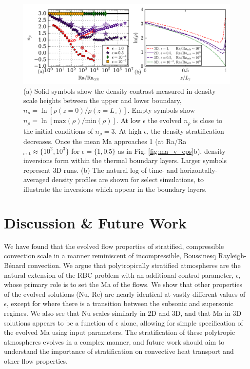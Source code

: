 \documentclass[aps, prfluids, onecolumn, notitlepage, nofootinbib, groupedaddress, amsfonts, amssymb, amsmath]{revtex4-1}
\newcommand{\RB}{Rayleigh-B\'{e}nard }
\begin{document}
\begin{figure}[t!]
\includegraphics[width=\textwidth]{./figs/density_v_ra.png}
\caption{\label{fig:nrho_v_ra} 
(a) Solid symbols show the density contrast measured
in density scale heights between the upper and lower boundary, 
$n_\rho = \ln[\rho(z=0)/\rho(z=L_z)]$.
Empty symbols show 
$n_\rho = \ln[\text{max}(\rho)/\text{min}(\rho)]$. 
At low $\epsilon$ the evolved
$n_{\rho}$ is close to the initial conditions of $n_\rho = 3$.  
At high $\epsilon$,
the density stratification decreases.  Once the mean 
Ma approaches 1 (at Ra/Ra$_{\text{crit}} \approx \{10^2, 10^3\}$ for $\epsilon = \{1, 0.5\}$
as in Fig. \ref{fig:ma_v_eps}b), density inversions form within the thermal
boundary layers. Larger symbols represent 3D runs. (b) The natural log of time-
and horizontally-averaged density profiles are shown for select simulations,
to illustrate the inversions which appear in the boundary layers.}
\end{figure}

\vspace{-0.5cm}
\section{Discussion \& Future Work}
We have found that the evolved flow properties of stratified,
compressible convection scale in a manner reminiscent of incompressible,
Boussinesq \RB convection.
We argue that polytropically stratified atmospheres are the natural
extension of the RBC problem with an additional control parameter, $\epsilon$,
whose primary role is to set the Ma of the flows.  We show that other properties
of the evolved solutions (Nu, Re) are nearly identical at vastly different values
of $\epsilon$, except for where there is a transition between the subsonic
and supersonic regimes.  We also see that Nu scales similarly in 2D and 3D,
and that Ma in 3D solutions appears to be a function of $\epsilon$ alone,
allowing for simple specification of the evolved Ma using input parameters.
The stratification of 
these polytropic atmospheres evolves in a complex
manner, and future work should aim to 
understand the importance of stratification on
convective heat transport and other flow properties.
\end{document}
